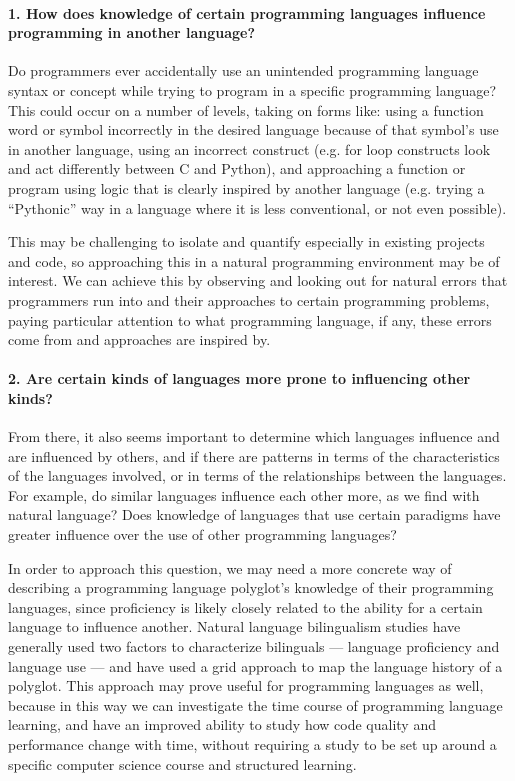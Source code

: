 \documentclass[a4paper,UKenglish,cleveref, autoref]{oasics-v2019}
\begin{document}
\paragraph*{1. How does knowledge of certain programming languages influence programming in another language?}

Do programmers ever accidentally use an unintended programming language syntax or concept while trying to program in a specific programming language? This could occur on a number of levels, taking on forms like: using a function word or symbol incorrectly in the desired language because of that symbol’s use in another language, using an incorrect construct (e.g. for loop constructs look and act differently between C and Python), and approaching a function or program using logic that is clearly inspired by another language (e.g. trying a “Pythonic” way in a language where it is less conventional, or not even possible). 

This may be challenging to isolate and quantify especially in existing projects and code, so approaching this in a natural programming environment may be of interest. We can achieve this by observing and looking out for natural errors that programmers run into and their approaches to certain programming problems, paying particular attention to what programming language, if any, these errors come from and approaches are inspired by.

\paragraph*{2. Are certain kinds of languages more prone to influencing other kinds?} 

From there, it also seems important to determine which languages influence and are influenced by others, and if there are patterns in terms of the characteristics of the languages involved, or in terms of the relationships between the languages. For example, do similar languages influence each other more, as we find with natural language? Does knowledge of languages that use certain paradigms have greater influence over the use of other programming languages? 

In order to approach this question, we may need a more concrete way of describing a programming language polyglot’s knowledge of their programming languages, since proficiency is likely closely related to the ability for a certain language to influence another. Natural language bilingualism studies have generally used two factors to characterize bilinguals — language proficiency and language use — and have used a grid approach to map the language history of a polyglot. This approach may prove useful for programming languages as well, because in this way we can investigate the time course of programming language learning, and have an improved ability to study how code quality and performance change with time, without requiring a study to be set up around a specific computer science course and structured learning. 
\end{document}
